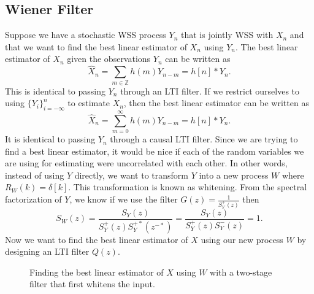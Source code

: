 \subsection{Wiener Filter}
Suppose we have a stochastic WSS process $Y_n$ that is jointly WSS with $X_n$ and that we want to find the best linear estimator of $X_n$ using $Y_n$.
The best linear estimator of $X_n$ given the observations $Y_n$ can be written as \[
	\hat{X}_n = \sum_{m\in\mathbb{Z}}h(m)Y_{n-m} = h[n] * Y_n.
\]
This is identical to passing $Y_n$ through an LTI filter.
If we restrict ourselves to using $\{Y_i\}_{i=-\infty}^{n}$ to estimate $X_n$, then the best linear estimator can be written as \[
	\hat{X}_n = \sum_{m=0}^\infty h(m)Y_{n-m} = h[n] * Y_n.
\]
It is identical to passing $Y_n$ through a causal LTI filter.
Since we are trying to find a best linear estimator, it would be nice if each of the random variables we are using for estimating were uncorrelated with each other.
In other words, instead of using $Y$ directly, we want to transform $Y$ into a new process $W$ where $R_W(k) = \delta[k]$.
This transformation is known as whitening.
From the spectral factorization of $Y$, we know if we use the filter $G(z) =\frac{1}{S_Y^+(z)}$ then \[
	S_W(z) = \frac{S_Y(z)}{S_Y^+(z)S_Y^{+*}(z^{-*})} = \frac{S_Y(z)}{S_Y^+(z)S_Y^-(z)} = 1.
\]
Now we want to find the best linear estimator of $X$ using our new process $W$ by designing an LTI filter $Q(z)$.
\begin{gitbook-image}
\begin{figure}[!h]
  \centering
	\caption{Finding the best linear estimator of $X$ using $W$ with a two-stage filter that first whitens the input.}
  \label{fig:wiener-filter}
\end{figure}
\end{gitbook-image}
